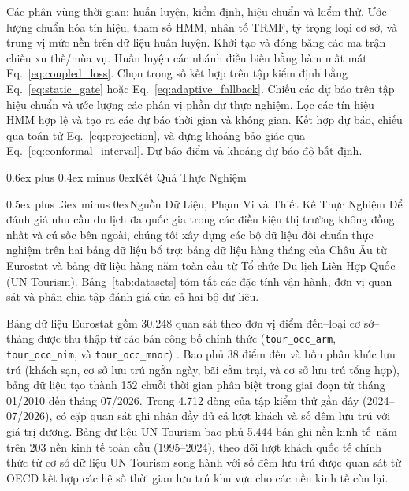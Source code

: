 \documentclass[10pt,journal,compsoc]{IEEEtran}
\makeatletter
\def\section{\@startsection{section}{1}{\z@}{-2.2ex plus -0.8ex minus -0.4ex}%
{0.6ex plus 0.4ex minus 0ex}{\normalfont\sublargesize\rmfamily\bfseries}}
\def\subsection{\@startsection{subsection}{2}{\z@}{-1.8ex plus -0.6ex minus -0.3ex}%
{0.5ex plus .3ex minus 0ex}{\normalfont\normalsize\rmfamily\bfseries}}
\makeatother
\begin{document}
\begin{algorithm}[!t]
\caption{Quy trình huấn luyện và suy diễn của RA-HE-DLinear}
\label{alg:pipeline}
\footnotesize
\begin{algorithmic}[1]
\REQUIRE Các phân vùng thời gian: huấn luyện, kiểm định, hiệu chuẩn và kiểm thử.
\STATE Ước lượng chuẩn hóa tín hiệu, tham số HMM, nhân tố TRMF, tỷ trọng loại cơ sở, và trung vị mức nền trên dữ liệu huấn luyện.
\STATE Khởi tạo và đóng băng các ma trận chiếu xu thế/mùa vụ. Huấn luyện các nhánh điều biến bằng hàm mất mát Eq.~\eqref{eq:coupled_loss}.
\STATE Chọn trọng số kết hợp trên tập kiểm định bằng Eq.~\eqref{eq:static_gate} hoặc Eq.~\eqref{eq:adaptive_fallback}.
\STATE Chiếu các dự báo trên tập hiệu chuẩn và ước lượng các phân vị phần dư thực nghiệm.
    \STATE Lọc các tín hiệu HMM hợp lệ và tạo ra các dự báo thời gian và không gian.
    \STATE Kết hợp dự báo, chiếu qua toán tử Eq.~\eqref{eq:projection}, và dựng khoảng bảo giác qua Eq.~\eqref{eq:conformal_interval}.
\ENDFOR
\RETURN Dự báo điểm và khoảng dự báo độ bất định.
\end{algorithmic}
\end{algorithm}

\section{\texorpdfstring{Kết Quả Thực Nghiệm}{Ket Qua Thuc Nghiem}}
\label{sec:results}

\subsection{Nguồn Dữ Liệu, Phạm Vi và Thiết Kế Thực Nghiệm}
\label{sec:data_design}
Để đánh giá nhu cầu du lịch đa quốc gia trong các điều kiện thị trường không đồng nhất và cú sốc bên ngoài, chúng tôi xây dựng các bộ dữ liệu đối chuẩn thực nghiệm trên hai bảng dữ liệu bổ trợ: bảng dữ liệu hàng tháng của Châu Âu từ Eurostat và bảng dữ liệu hàng năm toàn cầu từ Tổ chức Du lịch Liên Hợp Quốc (UN Tourism). Bảng~\ref{tab:datasets} tóm tắt các đặc tính vận hành, đơn vị quan sát và phân chia tập đánh giá của cả hai bộ dữ liệu.

Bảng dữ liệu Eurostat gồm 30.248 quan sát theo đơn vị điểm đến--loại cơ sở--tháng được thu thập từ các bản công bố chính thức (\texttt{tour\_\allowbreak occ\_\allowbreak arm}, \texttt{tour\_\allowbreak occ\_\allowbreak nim}, và \texttt{tour\_\allowbreak occ\_\allowbreak mnor}) \cite{eurostat_tourism_release,eurostat_api_metadata}. Bao phủ 38 điểm đến và bốn phân khúc lưu trú (khách sạn, cơ sở lưu trú ngắn ngày, bãi cắm trại, và cơ sở lưu trú tổng hợp), bảng dữ liệu tạo thành 152 chuỗi thời gian phân biệt trong giai đoạn từ tháng 01/2010 đến tháng 07/2026. Trong 4.712 dòng của tập kiểm thử gần đây (2024--07/2026), có \ReviewerObservedPairs{} cặp quan sát ghi nhận đầy đủ cả lượt khách và số đêm lưu trú với giá trị dương. Bảng dữ liệu UN Tourism bao phủ 5.444 bản ghi nền kinh tế--năm trên 203 nền kinh tế toàn cầu (1995--2024), theo dõi lượt khách quốc tế chính thức từ cơ sở dữ liệu UN Tourism song hành với số đêm lưu trú được quan sát từ OECD kết hợp các hệ số thời gian lưu trú khu vực cho các nền kinh tế còn lại.
\end{document}

